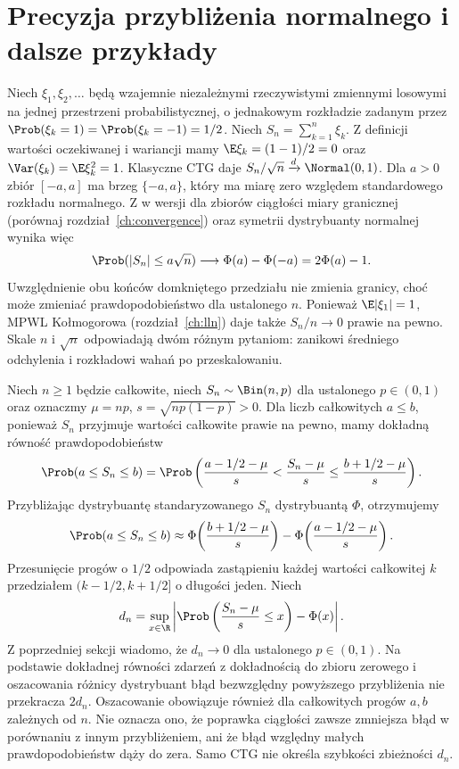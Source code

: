 \section{Precyzja przybliżenia normalnego i dalsze przykłady}

\begin{przyklad}
Niech $\xi_1,\xi_2,\ldots$ będą wzajemnie niezależnymi
rzeczywistymi zmiennymi losowymi na jednej przestrzeni
probabilistycznej, o jednakowym rozkładzie zadanym przez
$\Prob(\xi_k=1)=\Prob(\xi_k=-1)=1/2$.
Niech $S_n=\sum_{k=1}^n\xi_k$.
Z definicji wartości oczekiwanej i wariancji mamy
$\E\xi_k=(1-1)/2=0$ oraz
$\Var(\xi_k)=\E\xi_k^2=1$.
Klasyczne CTG daje $S_n/\sqrt n\xrightarrow d\Normal(0,1)$.
Dla $a>0$ zbiór $[-a,a]$ ma brzeg $\{-a,a\}$,
który ma miarę zero względem standardowego rozkładu
normalnego. Z 
w wersji dla zbiorów ciągłości miary granicznej
(porównaj rozdział~\ref{ch:convergence}) oraz
symetrii dystrybuanty normalnej wynika więc
\[
\Prob(|S_n|\leq a\sqrt n)
\longrightarrow\Phi(a)-\Phi(-a)=2\Phi(a)-1.
\]
Uwzględnienie obu końców domkniętego przedziału
nie zmienia granicy, choć może zmieniać
prawdopodobieństwo dla ustalonego $n$.
Ponieważ $\E|\xi_1|=1$, MPWL Kołmogorowa
(rozdział~\ref{ch:lln}) daje także $S_n/n\to0$
prawie na pewno. Skale $n$ i $\sqrt n$ odpowiadają
dwóm różnym pytaniom: zanikowi średniego
odchylenia i rozkładowi wahań po przeskalowaniu.
\end{przyklad}

\begin{przyklad}
Niech $n\geq1$ będzie całkowite, niech
$S_n\sim\Bin(n,p)$ dla ustalonego $p\in(0,1)$
oraz oznaczmy $\mu=np$, $s=\sqrt{np(1-p)}>0$.
Dla liczb całkowitych $a\leq b$, ponieważ $S_n$
przyjmuje wartości całkowite prawie na pewno, mamy
dokładną równość prawdopodobieństw
\[
\Prob(a\leq S_n\leq b)
=\Prob\left(\frac{a-1/2-\mu}{s}
<\frac{S_n-\mu}{s}\leq\frac{b+1/2-\mu}{s}\right).
\]
Przybliżając dystrybuantę standaryzowanego $S_n$
dystrybuantą $\Phi$, otrzymujemy
\[
\Prob(a\leq S_n\leq b)\approx
\Phi\!\left(\frac{b+1/2-\mu}{s}\right)-
\Phi\!\left(\frac{a-1/2-\mu}{s}\right).
\]
Przesunięcie progów o $1/2$ odpowiada zastąpieniu
każdej wartości całkowitej $k$ przedziałem
$(k-1/2,k+1/2]$ o długości jeden.
Niech
\[
d_n=\sup_{x\in\R}
\left|\Prob\left(\frac{S_n-\mu}{s}\leq x\right)-\Phi(x)\right|.
\]
Z poprzedniej sekcji wiadomo, że $d_n\to0$
dla ustalonego $p\in(0,1)$. Na podstawie dokładnej
równości zdarzeń z dokładnością do zbioru zerowego
i oszacowania różnicy dystrybuant błąd bezwzględny
powyższego przybliżenia nie przekracza $2d_n$.
Oszacowanie obowiązuje również dla całkowitych
progów $a,b$ zależnych od $n$. Nie oznacza ono,
że poprawka ciągłości zawsze zmniejsza błąd
w porównaniu z innym przybliżeniem, ani że błąd
względny małych prawdopodobieństw dąży do zera.
Samo CTG nie określa szybkości zbieżności $d_n$.
\end{przyklad}

